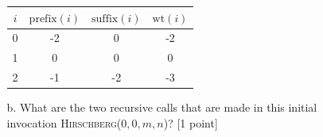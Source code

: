 \begin{enumerate}
\begin{enumerate}
{{\begin{center}
\begin{tabular}{|c|c|c|c|}
\hline
$i$ & $\mathrm{prefix}(i)$ & $\mathrm{suffix}(i)$ & $\mathrm{wt}(i)$\\
\hline
0 &-2 &0 &-2\\
\hline
1 &0 &0 &0\\
\hline
2 &-1 &-2 &-3\\
\hline
\end{tabular}
\end{center}

}}

\item[b.] What are the two recursive calls that are made in this initial invocation \textsc{Hirschberg}($0,0,m,n$)? [1 point]
\\[.5em]


\end{enumerate}
\end{enumerate}
